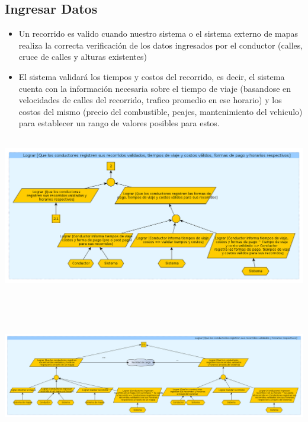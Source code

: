 \documentclass[a4paper,titlepage,10pt]{article}
\begin{document}
\subsection{Ingresar Datos}
\begin{itemize}
\item Un recorrido es valido cuando nuestro sistema o el sistema externo de mapas realiza la correcta verificaci\'on de los datos ingresados por el conductor (calles, cruce de calles y alturas existentes)
\item El sistema validará los tiempos y costos del recorrido, es decir, el sistema cuenta con la informaci\'on necesaria sobre el tiempo de viaje (basandose en velocidades de calles del recorrido, trafico promedio en ese horario) y los costos del mismo (precio del combustible, peajes, mantenimiento del vehiculo) para establecer un rango de valores posibles para estos.
\end{itemize}
\includegraphics[height=7cm,width=19.5cm]{imagenes/Ingresenrecorridos.png}
\includegraphics[height=7cm,width=19.5cm]{imagenes/Ingresenrecorridosa.png}

\newpage
\end{document}
